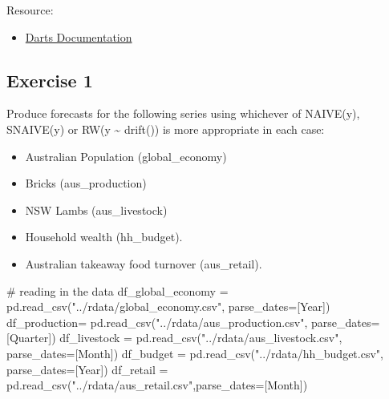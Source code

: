 \documentclass[
  11pt,
]{article}
\newenvironment{Shaded}{\begin{snugshade}}{\end{snugshade}}
\newcommand{\CommentTok}[1]{\textcolor[rgb]{0.37,0.37,0.37}{#1}}
\newcommand{\NormalTok}[1]{\textcolor[rgb]{0.00,0.23,0.31}{#1}}
\newcommand{\OperatorTok}[1]{\textcolor[rgb]{0.37,0.37,0.37}{#1}}
\newcommand{\StringTok}[1]{\textcolor[rgb]{0.13,0.47,0.30}{#1}}
\providecommand{\tightlist}{%
  \setlength{\itemsep}{0pt}\setlength{\parskip}{0pt}}\usepackage{longtable,booktabs,array}
\begin{document}
Resource:

\begin{itemize}
\tightlist
\item
  \href{https://unit8co.github.io/darts/quickstart/00-quickstart.html}{Darts
  Documentation}
\end{itemize}

\subsection{Exercise 1}\label{exercise-1}

Produce forecasts for the following series using whichever of NAIVE(y),
SNAIVE(y) or RW(y \textasciitilde{} drift()) is more appropriate in each
case:

\begin{itemize}
\item
  Australian Population (global\_economy)
\item
  Bricks (aus\_production)
\item
  NSW Lambs (aus\_livestock)
\item
  Household wealth (hh\_budget).
\item
  Australian takeaway food turnover (aus\_retail).
\end{itemize}

\begin{Shaded}
\begin{Highlighting}[]
\CommentTok{\# reading in the data}
\NormalTok{df\_global\_economy }\OperatorTok{=}\NormalTok{ pd.read\_csv(}\StringTok{"../rdata/global\_economy.csv"}\NormalTok{, parse\_dates}\OperatorTok{=}\NormalTok{[}\StringTok{\textquotesingle{}Year\textquotesingle{}}\NormalTok{])}
\NormalTok{df\_production}\OperatorTok{=}\NormalTok{ pd.read\_csv(}\StringTok{"../rdata/aus\_production.csv"}\NormalTok{, parse\_dates}\OperatorTok{=}\NormalTok{[}\StringTok{\textquotesingle{}Quarter\textquotesingle{}}\NormalTok{])}
\NormalTok{df\_livestock }\OperatorTok{=}\NormalTok{ pd.read\_csv(}\StringTok{"../rdata/aus\_livestock.csv"}\NormalTok{, parse\_dates}\OperatorTok{=}\NormalTok{[}\StringTok{\textquotesingle{}Month\textquotesingle{}}\NormalTok{])}
\NormalTok{df\_budget }\OperatorTok{=}\NormalTok{ pd.read\_csv(}\StringTok{"../rdata/hh\_budget.csv"}\NormalTok{, parse\_dates}\OperatorTok{=}\NormalTok{[}\StringTok{\textquotesingle{}Year\textquotesingle{}}\NormalTok{])}
\NormalTok{df\_retail }\OperatorTok{=}\NormalTok{ pd.read\_csv(}\StringTok{"../rdata/aus\_retail.csv"}\NormalTok{,parse\_dates}\OperatorTok{=}\NormalTok{[}\StringTok{\textquotesingle{}Month\textquotesingle{}}\NormalTok{])}
\end{Highlighting}
\end{Shaded}
\end{document}
